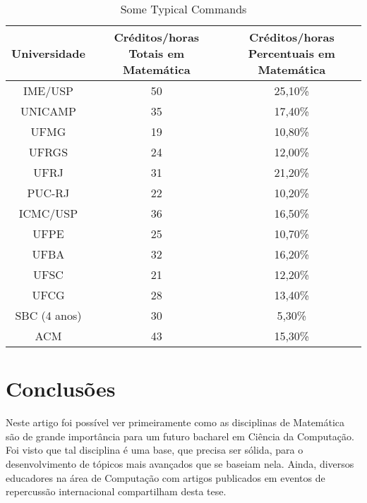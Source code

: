 \documentclass[conference]{IEEEtran}
\begin{document}
\begin{table}
	\centering
	\caption{Some Typical Commands}
    \begin{tabular}{|c|c|c|}
        \hline
        Universidade & Créditos/horas Totais em Matemática & Créditos/horas Percentuais em Matemática \\ \hline
        IME/USP      & 50                                  & 25,10\%                                   \\ 
        UNICAMP      & 35                                  & 17,40\%                                   \\ 
        UFMG         & 19                                  & 10,80\%                                   \\ 
        UFRGS        & 24                                  & 12,00\%                                   \\ 
        UFRJ         & 31                                  & 21,20\%                                   \\ 
        PUC-RJ       & 22                                  & 10,20\%                                   \\ 
        ICMC/USP     & 36                                  & 16,50\%                                   \\ 
        UFPE         & 25                                  & 10,70\%                                   \\ 
        UFBA         & 32                                  & 16,20\%                                   \\ 
        UFSC         & 21                                  & 12,20\%                                   \\ 
        UFCG         & 28                                  & 13,40\%                                   \\ 
        SBC (4 anos) & 30                                  & 5,30\%                                    \\ 
        ACM          & 43                                  & 15,30\%                                   \\
        \hline
    \end{tabular}
\end{table}

\section{Conclusões}
	Neste artigo foi possível ver primeiramente como as disciplinas de Matemática são de grande importância para um futuro bacharel em Ciência da Computação. Foi visto que tal disciplina é uma base, que precisa ser sólida, para o desenvolvimento de tópicos mais avançados que se baseiam nela. Ainda, diversos educadores na área de Computação com artigos publicados em eventos de repercussão internacional compartilham desta tese.
	
\end{document}
